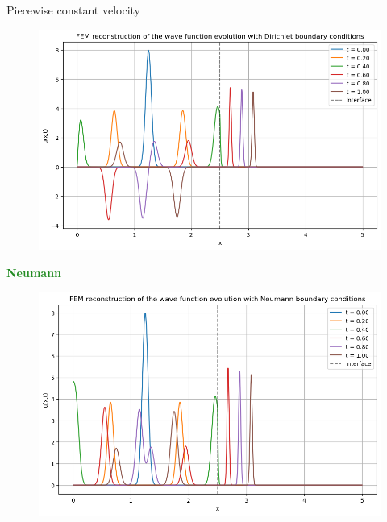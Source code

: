 \begin{frame}{Piecewise constant velocity}
{\begin{minipage}{0.49\textwidth}
        \begin{figure}[H]
            \centering
            \includegraphics[width=\textwidth]{Immagini/plot-dirichlet-piecewise-c1>c2.png}
        \end{figure}
    \end{minipage}
    \hfill
    \begin{minipage}{0.49\textwidth}
        \begin{center}
            \textcolor{ForestGreen}{\textbf{Neumann}}
        \end{center}

        \vspace{-0.3cm}

        \begin{figure}[H]
            \centering
            \includegraphics[width=\textwidth]{Immagini/plot-neumann-piecewise-c1>c2.png}
        \end{figure}
    \end{minipage}}{}

    \normalsize
\end{frame}

